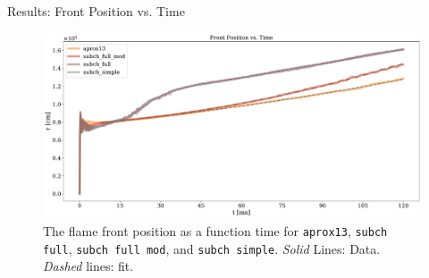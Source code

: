 \documentclass[
	11pt, %
]{beamer}
\begin{document}
    
    




\begin{frame}{Results: Front Position vs. Time}
    \begin{figure}
        \centering
        \includegraphics[width=1\linewidth]{network_front.pdf}
        \caption{The flame front position as a function time for {\tt aprox13}, {\tt subch full}, {\tt subch full mod}, and {\tt subch simple}. {\it Solid} Lines: Data. {\it Dashed} lines: fit.}
    \end{figure}
    
    
\end{frame}
\end{document}
